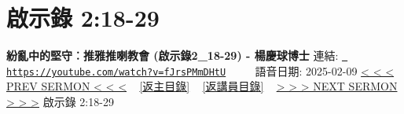 \documentclass{book}
\begin{document}
\section{啟示錄 2:18-29}
\label{sec:fJrsPMmDHtU}
\textbf{紛亂中的堅守︰推雅推喇教會 (啟示錄2\_18-29) - 楊慶球博士}
\newline
\newline
連結: \href{https://youtube.com/watch?v=fJrsPMmDHtU}{\texttt{ https://youtube.com/watch?v=fJrsPMmDHtU}} ~~~~ 語音日期: 2025-02-09 
\newline
\newline
\hyperref[sec:l8BFPdIOADs]{< < < PREV SERMON < < <}
~
\hyperlink{toc}{[返主目錄]}
~
\hyperref[ch:preacher3]{[返講員目錄]}
~
\hyperref[sec:toZa1ewaUWE]{> > > NEXT SERMON > > >}
\newline
\newline
啟示錄 2:18-29
\newline
\end{document}
